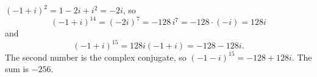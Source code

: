 $(-1+i)^2=1-2i+i^2=-2i$, so
\[(-1+i)^{14}=(-2i)^7=-128\,i^7=-128\cdot(-i)=128i\]
and
\[(-1+i)^{15}=128i(-1+i)=-128-128i.\]
The second number is the complex conjugate, so $(-1-i)^{15}=-128+128i$. The sum is $\boxed{-256}$.
